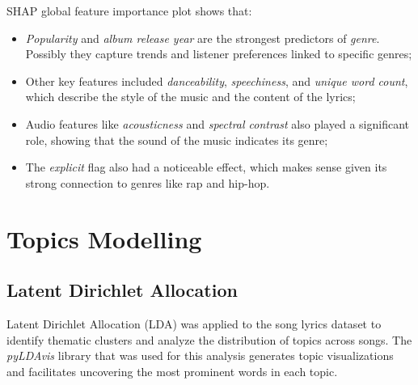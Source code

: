 SHAP global feature importance plot shows that:
\begin{itemize}
  \item \textit{Popularity} and \textit{album release year} are the strongest
    predictors of \textit{genre}.  Possibly they capture trends and listener
    preferences linked to specific genres;
  \item Other key features included \textit{danceability},
    \textit{speechiness}, and \textit{unique word count}, which describe the
    style of the music and the content of the lyrics;
  \item Audio features like \textit{acousticness} and
    \textit{spectral contrast} also played a significant role, showing
    that the sound of the music indicates its genre;
  \item The \textit{explicit} flag also had a noticeable effect, which makes
    sense given its strong connection to genres like rap and hip-hop.

\end{itemize}



\section{Topics Modelling}
\label{sec:topicsmodelling}

\subsection{Latent Dirichlet Allocation}

Latent Dirichlet Allocation (LDA) was applied to the song lyrics dataset to
identify thematic clusters and analyze the distribution of topics across songs.
The \textit{pyLDAvis} library that was used for this analysis generates topic
visualizations and facilitates uncovering the most prominent words in each
topic.\cite{pylda}


